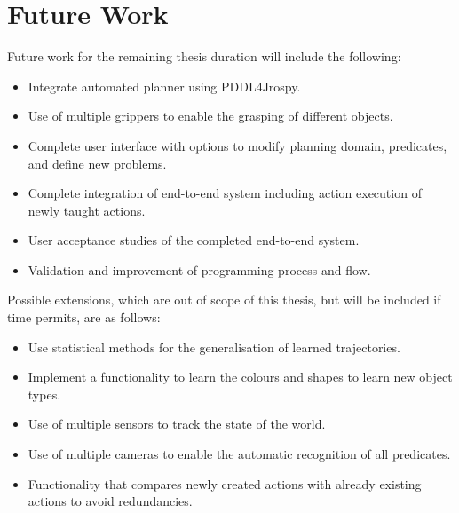 \section{Future Work}
Future work for the remaining thesis duration will include the following:
\begin{itemize}
\item Integrate automated planner using PDDL4Jrospy.
\item Use of multiple grippers to enable the grasping of different objects.
\item Complete user interface with options to modify planning domain, predicates, and define new problems.
\item Complete integration of end-to-end system including action execution of newly taught actions.
\item User acceptance studies of the completed end-to-end system.
\item Validation and improvement of programming process and flow.
\end{itemize}

Possible extensions, which are out of scope of this thesis, but will be included if time permits, are as follows:
\begin{itemize}
	\item Use statistical methods for the generalisation of learned trajectories.
	\item Implement a functionality to learn the colours and shapes to learn new object types.
	\item Use of multiple sensors to track the state of the world.
	\item Use of multiple cameras to enable the automatic recognition of all predicates.
	\item Functionality that compares newly created actions with already existing actions to avoid redundancies.
\end{itemize}